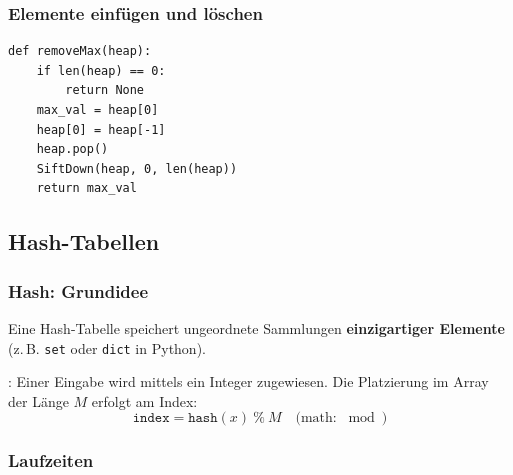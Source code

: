 \subsubsection{Elemente einfügen und löschen}
\begin{contentbox}
\begin{factlist}
\end{factlist}
\end{contentbox}
\begin{codebox}
\begin{lstlisting}[style=CodeExpert]
def removeMax(heap):
    if len(heap) == 0:
        return None
    max_val = heap[0]
    heap[0] = heap[-1]
    heap.pop()
    SiftDown(heap, 0, len(heap))
    return max_val
\end{lstlisting}
\end{codebox}




\subsection{Hash-Tabellen}\label{sec:09-hash-tabellen}

\subsubsection{Hash: Grundidee}
\begin{defbox}
Eine Hash-Tabelle speichert ungeordnete Sammlungen \textbf{einzigartiger Elemente} (z.\,B. \texttt{set} oder \texttt{dict} in Python).

: Einer Eingabe wird mittels  ein Integer zugewiesen. Die Platzierung im Array der Länge $M$ erfolgt am Index:
\[
\texttt{index} = \texttt{hash}(x)\ \%\ M \quad(\text{math: } \bmod)
\]
\end{defbox}

\subsubsection{Laufzeiten}
\begin{contentbox}
\begin{factlist}
\end{factlist}
\end{contentbox}

